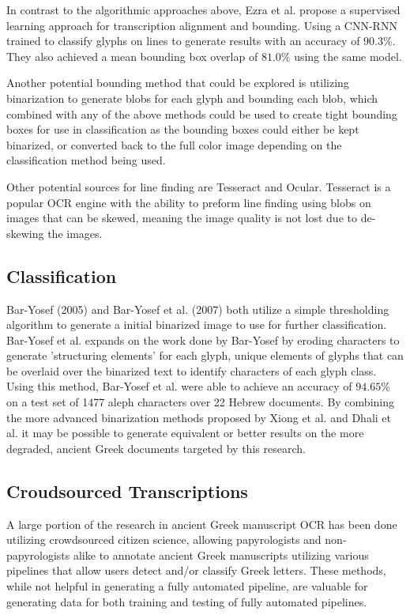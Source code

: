 \documentclass[12pt,a4paper,final]{article}
\begin{document}
In contrast to the algorithmic approaches above, Ezra et al.\cite{Ezra} propose a supervised learning approach for transcription alignment and bounding. Using a CNN-RNN trained to classify glyphs on lines to generate results with an accuracy of $90.3\%$. They also achieved a mean bounding box overlap of $81.0\%$ using the same model.

Another potential bounding method that could be explored is utilizing binarization to generate blobs for each glyph and bounding each blob, which combined with any of the above methods could be used to create tight bounding boxes for use in classification as the bounding boxes could either be kept binarized, or converted back to the full color image depending on the classification method being used.

Other potential sources for line finding are Tesseract\cite{SmithTesseract} and Ocular\cite{Berg-Kirkpatrick}. Tesseract is a popular OCR engine with the ability to preform line finding \cite{SmithLines} using blobs on images that can be skewed, meaning the image quality is not lost due to de-skewing the images.

\subsection{Classification}

Bar-Yosef (2005)\cite{Bar-Yosef2005} and Bar-Yosef et al. (2007)\cite{Bar-Yosef2005} both utilize a simple thresholding algorithm to generate a initial binarized image to use for further classification. Bar-Yosef et al. expands on the work done by Bar-Yosef by eroding characters to generate 'structuring elements' for each glyph, unique elements of glyphs that can be overlaid over the binarized text to identify characters of each glyph class. Using  this method, Bar-Yosef et al. were able to achieve an accuracy of $94.65\%$ on a test set of 1477 aleph characters over 22 Hebrew documents. By combining the more advanced binarization methods proposed by Xiong et al. and Dhali et al. it may be possible to generate equivalent or better results on the more degraded, ancient Greek documents targeted by this research.

\subsection{Croudsourced Transcriptions}
A large portion of the research in ancient Greek manuscript OCR has been done utilizing crowdsourced citizen science, allowing papyrologists and non-papyrologists alike to annotate ancient Greek manuscripts utilizing various pipelines that allow users detect and/or classify Greek letters.\cite{Williams2014, Williams2015, Tabin, Atanasiu} These methods, while not helpful in generating a fully automated pipeline, are valuable for generating data for both training and testing of fully automated pipelines.
\end{document}
